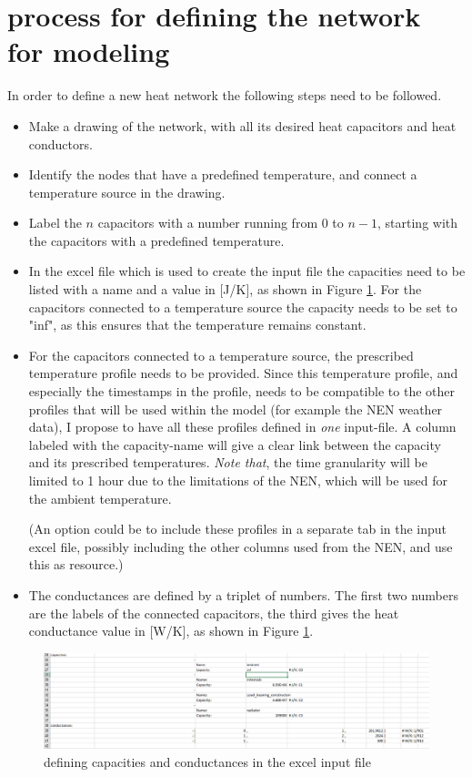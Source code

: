 \section{process for defining the network for modeling}
In order to define a new heat network the following steps need to be followed.
\begin{itemize}
\item Make a drawing of the network, with all its desired heat capacitors and  heat conductors.
\item Identify the nodes that have a predefined temperature, and connect a temperature source in the drawing.
\item Label the $n$ capacitors with a number running from 0 to $n-1$, starting with the capacitors with a predefined temperature. 
\item In the excel file which is used to create the input file the capacities need to be listed with a name and a value in [J/K], as shown in Figure \ref{fig:snip_excel}. For the capacitors connected to a temperature source the capacity needs to be set to "inf", as this ensures that the temperature remains constant. 
\item For the capacitors connected to a temperature source, the prescribed temperature profile needs to be provided. Since this temperature profile, and especially the timestamps in the profile,  needs to be compatible to the other profiles that will be used within the model (for example the NEN weather data), I propose to have all these profiles defined in \emph{one} input-file. A column labeled with the capacity-name will give a clear link between the capacity and its prescribed temperatures. \emph{Note that}, the time granularity will be limited to 1 hour due to the limitations of the NEN, which will be used for the ambient temperature. 

(An option could be to include these profiles in a separate tab in the input excel file, possibly including the other columns used from the NEN, and use this as resource.) 
\item The conductances are defined by a triplet of numbers. The first two numbers are the labels of the connected capacitors, the third gives the heat conductance value in [W/K], as shown in Figure \ref{fig:snip_excel}.  
\end{itemize}


\begin{figure}
	\centering
	\includegraphics[width=0.95\columnwidth]{Pictures/snip_excel}
	\caption[Short title]{defining capacities and conductances in the excel input file}
	\label{fig:snip_excel}
\end{figure} 


